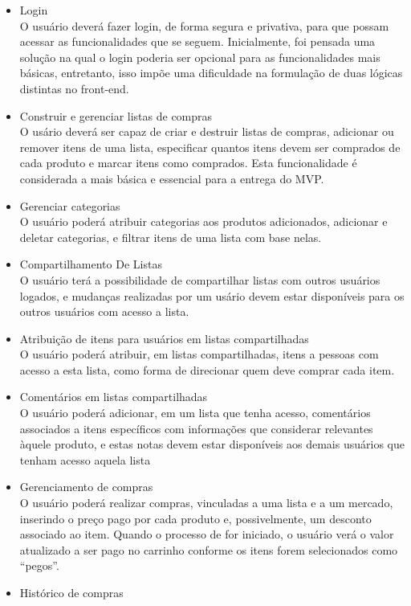 \begin{itemize}
\item Login\\
  O usuário deverá fazer login, de forma segura e privativa, para que
  possam acessar as funcionalidades que se seguem. Inicialmente, foi
  pensada uma solução na qual o login poderia ser opcional para as
  funcionalidades mais básicas, entretanto, isso impõe uma dificuldade
  na formulação de duas lógicas distintas no front-end.
\item Construir e gerenciar listas de compras\\
  O usário deverá ser capaz de criar e destruir listas de compras, adicionar ou
  remover itens de uma lista, especificar quantos itens devem ser
  comprados de cada produto e marcar itens como comprados. Esta
  funcionalidade é considerada a mais básica e essencial para a
  entrega do MVP.
\item Gerenciar categorias\\
  O usuário poderá atribuir categorias aos produtos adicionados,
  adicionar e deletar categorias, e filtrar itens de uma lista com base nelas.
\item Compartilhamento De Listas\\
  O usuário terá a possibilidade de compartilhar listas com outros
  usuários logados, e mudanças realizadas por um usário devem estar
  disponíveis para os outros usuários com acesso a lista.
\item Atribuição de itens para usuários em listas compartilhadas\\
  O usuário poderá atribuir, em listas compartilhadas, itens a pessoas
  com acesso a esta lista, como forma de direcionar quem deve comprar
  cada item.
\item Comentários em listas compartilhadas\\
  O usuário poderá adicionar, em um lista que tenha acesso,
  comentários associados a itens específicos com informações que
  considerar relevantes àquele produto, e estas notas devem estar
  disponíveis aos demais usuários que tenham acesso aquela lista
\item Gerenciamento de compras\\
  O usuário poderá realizar compras, vinculadas a uma lista e a um
  mercado, inserindo o preço pago por cada produto e, possivelmente,
  um desconto associado ao item. Quando o processo de for iniciado, o
  usuário verá o valor atualizado a ser pago no carrinho conforme os
  itens forem selecionados como ``pegos''.
\item Histórico de compras\\

\end{itemize}
